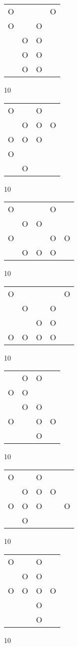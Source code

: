 \begin{tabular}{|m{0.2cm}m{0.2cm}m{0.2cm}m{0.2cm}|}\hline
O& & &O\\
O& &O& \\
 &O&O& \\
 &O&O& \\
 &O&O& \\
\hline\end{tabular}10
\begin{tabular}{|m{0.2cm}m{0.2cm}m{0.2cm}m{0.2cm}|}\hline
O& &O& \\
 &O&O&O\\
O&O&O& \\
O& & & \\
 &O& & \\
\hline\end{tabular}10
\begin{tabular}{|m{0.2cm}m{0.2cm}m{0.2cm}m{0.2cm}m{0.2cm}|}\hline
O& & &O& \\
 &O&O& & \\
O& & &O&O\\
 &O&O&O& \\
\hline\end{tabular}10
\begin{tabular}{|m{0.2cm}m{0.2cm}m{0.2cm}m{0.2cm}m{0.2cm}|}\hline
O& & & &O\\
 &O& &O& \\
 & &O&O& \\
O&O&O&O& \\
\hline\end{tabular}10
\begin{tabular}{|m{0.2cm}m{0.2cm}m{0.2cm}m{0.2cm}|}\hline
 &O&O& \\
O&O& & \\
 &O&O& \\
O& &O&O\\
 & &O& \\
\hline\end{tabular}10
\begin{tabular}{|m{0.2cm}m{0.2cm}m{0.2cm}m{0.2cm}m{0.2cm}|}\hline
O& &O& & \\
 &O&O&O& \\
O&O&O& &O\\
 &O& & & \\
\hline\end{tabular}10
\begin{tabular}{|m{0.2cm}m{0.2cm}m{0.2cm}m{0.2cm}|}\hline
O& &O& \\
 &O&O& \\
O&O&O&O\\
 & &O& \\
 & &O& \\
\hline\end{tabular}10
